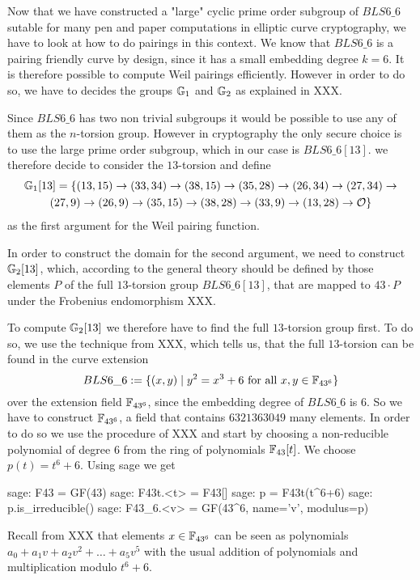 \endgroup

Now that we have constructed a "large" cyclic prime order subgroup of $BLS6\_6$ sutable for many pen and paper computations in elliptic curve cryptography, we have to look at how to do pairings in this context. We know that $BLS6\_6$ is a pairing friendly curve by design, since it has a small embedding degree $k=6$. It is therefore possible to compute Weil pairings efficiently. However in order to do so, we have to decides the groups $\mathbb{G}_1$ and $\mathbb{G}_2$ as explained in XXX.

Since $BLS6\_6$ has two non trivial subgroups it would be possible to use any of them as the $n$-torsion group. However in cryptography the only secure choice is to use the large prime order subgroup, which in our case is $BLS6\_6[13]$. we therefore decide to consider the $13$-torsion and define
\begin{multline*}
\mathbb{G}_1[13]=\{(13,15) \rightarrow (33,34) \rightarrow  (38,15) \rightarrow  (35,28) \rightarrow (26,34) \rightarrow  (27,34) \rightarrow  \\
(27,9)  \rightarrow  (26,9) \rightarrow  (35,15) \rightarrow  (38,28) \rightarrow  (33,9) \rightarrow (13,28) \rightarrow  \mathcal{O}\}$$
\end{multline*}
as the first argument for the Weil pairing function.

In order to construct the domain for the second argument, we need to construct $\mathbb{G}_2[13]$, which, according to the general theory should be defined by those elements $P$ of the full $13$-torsion group $BLS6\_6[13]$, that are mapped to $43\cdot P$ under the Frobenius endomorphism XXX.

To compute $\mathbb{G}_2[13]$ we therefore have to find the full $13$-torsion group first. To do so, we use the technique from XXX, which tells us, that the full $13$-torsion can be found in the curve extension
\begin{equation}
BLS6\_6 := \{(x,y)\;|\; y^2 = x^3 + 6 \text{ for all } x,y \in \mathbb{F}_{43^6}\}
\end{equation}
over the extension field $\mathbb{F}_{43^6}$, since the embedding degree of $BLS6\_6$ is $6$. So we have to construct $\mathbb{F}_{43^6}$, a field that contains $6321363049$ many elements. In order to do so we use the procedure of XXX and start by choosing a non-reducible polynomial of degree $6$ from the ring of polynomials $\mathbb{F}_{43}[t]$. We choose $p(t) = t^6+6$. Using sage we get
\begin{sagecommandline}
sage: F43 = GF(43)
sage: F43t.<t> = F43[]
sage: p = F43t(t^6+6)
sage: p.is_irreducible()
sage: F43_6.<v> = GF(43^6, name='v', modulus=p)
\end{sagecommandline}
Recall from XXX that elements $x\in\mathbb{F}_{43^6}$ can be seen as polynomials $a_0+a_1v + a_2v^2+\ldots + a_5 v^5$ with the usual addition of polynomials and multiplication modulo $t^6+6$.

